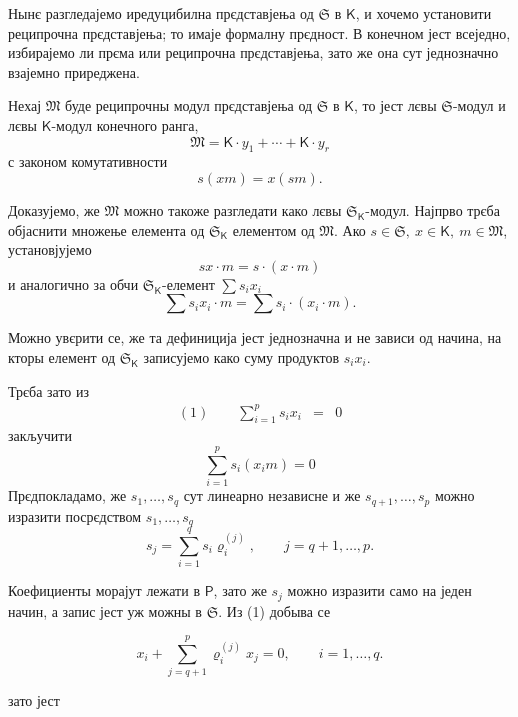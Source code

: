 \documentclass[11pt]{article}
\begin{document}
Нынє разгледајемо иредуцибилна прєдставјења од \(\mathfrak S\) в \(\mathsf K\), и хочемо установити реципрочна прєдставјења; то имаје формалну прєдност. В конечном јест всеједно, избирајемо ли прєма или реципрочна прєдставјења, зато же она сут једнозначно взајемно приреджена.

Нехај \(\mathfrak M\) буде реципрочны модул прєдставјења од \(\mathfrak S\) в \(\mathsf K\), то јест лєвы \(\mathfrak S\)-модул и лєвы \(\mathsf K\)-модул конечного ранга,
\[
\mathfrak M=\mathsf K\cdot y_1+\cdots+\mathsf K\cdot y_r
\]
с законом комутативности
\[
s(xm)=x(sm).
\]

Доказујемо, же \(\mathfrak M\) можно такоже разгледати како лєвы \(\mathfrak S_{\mathsf K}\)-модул. Најпрво трєба објаснити множење елемента од \(\mathfrak S_{\mathsf K}\) елементом од \(\mathfrak M\). Ако \(s\in\mathfrak S,\ x\in\mathsf K,\ m\in\mathfrak M\), установјујемо
\[
sx\cdot m=s\cdot(x\cdot m)
\]
и аналогично за обчи \(\mathfrak S_{\mathsf K}\)-елемент \(\sum s_ix_i\)
\[
\sum s_ix_i\cdot m=\sum s_i\cdot(x_i\cdot m).
\]

Можно увєрити се, же та дефиниција јест једнозначна и не зависи од начина, на кторы елемент од \(\mathfrak S_{\mathsf K}\) записујемо како суму продуктов \(s_ix_i\).

Трєба зато из
\[
\begin{array}{rcl}
(1)\qquad \displaystyle\sum_{i=1}^{p}s_ix_i&=&0
\end{array}
\]
закључити
\[
\sum_{i=1}^{p}s_i(x_i m)=0
\]
Прєдпокладамо, же \(s_1,\ldots,s_q\) сут линеарно независне и же \(s_{q+1},\ldots,s_p\) можно изразити посрєдством \(s_1,\ldots,s_q\)
\[
s_j=\sum_{i=1}^{q}s_i\varrho_i^{(j)},\qquad j=q+1,\ldots,p.
\]

Коефициенты морајут лежати в \(\mathsf P\), зато же \(s_j\) можно изразити само на једен начин, а запис јест уж можны в \(\mathfrak S\). Из (1) добыва се

\[
x_i+\sum_{j=q+1}^{p}\varrho_i^{(j)}x_j=0,\qquad i=1,\ldots,q.
\]

зато јест
\end{document}
